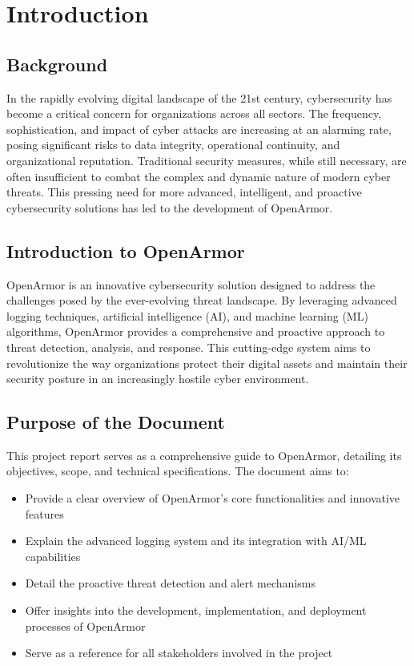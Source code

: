 \chapter{Introduction}\doublespacing

\section{Background}
In the rapidly evolving digital landscape of the 21st century, cybersecurity has become a critical concern for organizations across all sectors. The frequency, sophistication, and impact of cyber attacks are increasing at an alarming rate, posing significant risks to data integrity, operational continuity, and organizational reputation. Traditional security measures, while still necessary, are often insufficient to combat the complex and dynamic nature of modern cyber threats. This pressing need for more advanced, intelligent, and proactive cybersecurity solutions has led to the development of OpenArmor.

\section{Introduction to OpenArmor}
OpenArmor is an innovative cybersecurity solution designed to address the challenges posed by the ever-evolving threat landscape. By leveraging advanced logging techniques, artificial intelligence (AI), and machine learning (ML) algorithms, OpenArmor provides a comprehensive and proactive approach to threat detection, analysis, and response. This cutting-edge system aims to revolutionize the way organizations protect their digital assets and maintain their security posture in an increasingly hostile cyber environment.

\section{Purpose of the Document}
This project report serves as a comprehensive guide to OpenArmor, detailing its objectives, scope, and technical specifications. The document aims to:

\begin{itemize}
    \item Provide a clear overview of OpenArmor's core functionalities and innovative features
    \item Explain the advanced logging system and its integration with AI/ML capabilities
    \item Detail the proactive threat detection and alert mechanisms
    \item Offer insights into the development, implementation, and deployment processes of OpenArmor
    \item Serve as a reference for all stakeholders involved in the project
\end{itemize}


